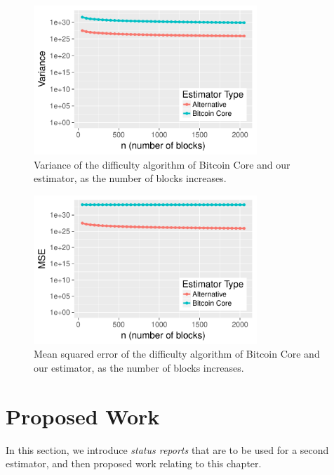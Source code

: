 \begin{figure}\begin{center}
	\includegraphics[width=0.75\textwidth]{graphs/variance}
	\caption{Variance of the difficulty algorithm of Bitcoin Core and our estimator, as the number of blocks increases.
	\label{fig:variance}}
\end{center}\end{figure}

\begin{figure}\begin{center}
	\includegraphics[width=0.75\textwidth]{graphs/MSE}
	\caption{Mean squared error of the difficulty algorithm of Bitcoin Core and our estimator, as the number of blocks increases.
	\label{fig:MSE}}
\end{center}\end{figure}


\section{Proposed Work} \label{section:difficulty-proposed-work}
In this section, we introduce \textit{status reports} that are to be used for a second estimator, and then proposed work relating to this chapter.

